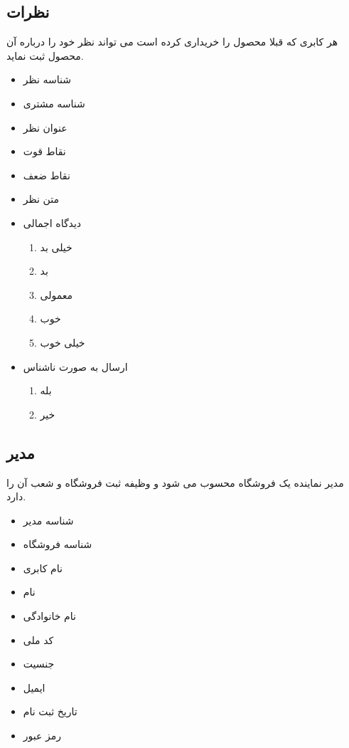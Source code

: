 \documentclass[]{article}
\begin{document}
\subsection{نظرات}
هر کابری که قبلا محصول را خریداری کرده است می تواند نظر خود را درباره آن محصول ثبت نماید.
\begin{itemize}
\item شناسه نظر
\item شناسه مشتری
\item عنوان نظر
\item نقاط قوت  
\item نقاط ضعف
\item متن نظر
\item دیدگاه اجمالی
\begin{enumerate}
\item خیلی بد
\item بد
\item معمولی
\item  خوب
\item  خیلی خوب
\end{enumerate}
\item ارسال به صورت ناشناس
\begin{enumerate}
\item بله
\item خیر
\end{enumerate}
\end{itemize}





\subsection{مدیر}
مدیر نماینده یک فروشگاه محسوب می شود و وظیفه ثبت فروشگاه و شعب آن را دارد.
\begin{itemize}
\item شناسه مدیر
\item شناسه فروشگاه
\item نام کابری
\item نام
\item نام خانوادگی
\item کد ملی
\item جنسیت
\item ایمیل
\item تاریخ ثبت نام
\item رمز عبور 
\end{itemize}
\end{document}
